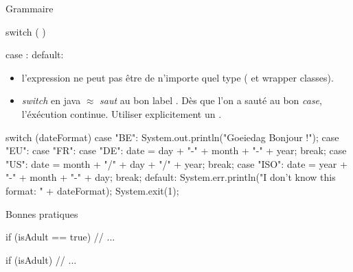 \begin{hideedit}
\begin{frame}[fragile]{Grammaire}
\begin{grammaire}
    switch (  ) 


    case :
    default:
\end{grammaire}

  \begin{itemize}
    \item l'expression ne peut pas être de n'importe quel type ( et wrapper classes).
    \item \textit{switch} en java \(\approx\) \og \textit{saut}
      au bon label \fg. Dès que l'on a sauté au bon
      \textit{case}, l'éxécution continue. Utiliser explicitement un
      .
  \end{itemize}
\end{frame}

\begin{frame}[fragile]
  \begin{java}
switch (dateFormat) {
    case "BE":
        System.out.println("Goeiedag Bonjour !");
    case "EU": case "FR": case "DE":
        date = day + "-" + month + "-" + year;
        break;
    case "US":
        date = month + "/" + day + "/" + year;
        break;
    case "ISO":
        date = year + "-" + month + "-" + day;
        break;
    default:
        System.err.println("I don't know this format: "
                + dateFormat);
        System.exit(1);
}
  \end{java}
\end{frame}


\begin{frame}[fragile]{Bonnes pratiques}

  \begin{wrong}
  \begin{java}
if (isAdult == true) {
    // ...
}
  \end{java}
  \end{wrong}

  \pause
  \begin{java}
if (isAdult) {
    // ...
}
  \end{java}
\end{frame}


\end{hideedit}

